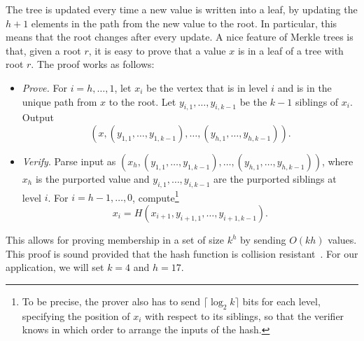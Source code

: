 The tree is updated every time a new value is written into a leaf, by updating the $h+1$ elements in the path from the new value to the root. In particular, this means that the root changes after every update. A nice feature of Merkle trees is that, given a root $r$, it is easy to prove that a value $x$ is in a leaf of a tree with root $r$. The proof works as follows: 
\begin{itemize}
	\item \emph{Prove.} For $i=h,\dots,1$, let $x_i$ be the vertex that is in level $i$ and is in the unique path from $x$ to the root. Let $y_{i, 1},\dots, y_{i, k-1}$ be the $k-1$ siblings of $x_i$. Output
	\[(x, (y_{1,1}, \dots, y_{1,k-1}), \dots, (y_{h,1},\dots,y_{h,k-1})).\]
	\item \emph{Verify}. Parse input as $(x_h, (y_{1,1}, \dots, y_{1,k-1}), \dots, (y_{h,1},\dots,y_{h,k-1}))$, where $x_h$ is the purported value and $y_{i,1},\dots,y_{i,k-1}$ are the purported siblings at level $i$. For $i=h-1,\dots, 0$, compute\footnote{To be precise, the prover also has to send $\lceil\log_2k\rceil$ bits for each level, specifying the position of $x_i$ with respect to its siblings, so that the verifier knows in which order to arrange the inputs of the hash.}
	\[x_i = H\left( x_{i+1}, y_{i+1,1},\dots,y_{i+1,k-1} \right).\] 
\end{itemize}

This allows for proving membership in a set of size $k^h$ by sending $O(kh)$ values. This proof is sound provided that the hash function is collision resistant~\cite[Section 5.6.2]{katz2020introduction}. For our application, we will set $k=4$ and $h=17$.